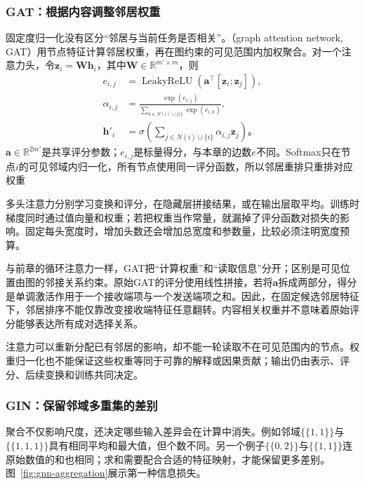 \subsubsection{GAT：根据内容调整邻居权重}
\label{sec:gnn-gat}

固定度归一化没有区分“邻居与当前任务是否相关”。（graph attention network, GAT）用节点特征计算邻居权重，再在图约束的可见范围内加权聚合。对一个注意力头，令$\bm{z}_i=\bm{W}\bm{h}_i$，其中$\bm{W}\in\mathbb{R}^{m'\times m}$，则
\begin{equation}
  \begin{aligned}
    e_{i,j}&=\operatorname{LeakyReLU}
      \!\left(\bm{a}^{\top}[\bm{z}_i;\bm{z}_j]\right),\\
    \alpha_{i,j}&=\frac{\exp(e_{i,j})}
      {\sum_{k\in N(i)\cup\{i\}}\exp(e_{i,k})},\\
    \bm{h}'_i&=\sigma\!\left(\sum_{j\in N(i)\cup\{i\}}
      \alpha_{i,j}\bm{z}_j\right)\text{。}
  \end{aligned}
  \label{eq:gnn-gat}
\end{equation}
$\bm{a}\in\mathbb{R}^{2m'}$是共享评分参数；$e_{i,j}$是标量得分，与本章的边数$e$不同。Softmax只在节点$i$的可见邻域内归一化，所有节点使用同一评分函数，所以邻居重排只重排对应权重

多头注意力分别学习变换和评分，在隐藏层拼接结果，或在输出层取平均。训练时梯度同时通过值向量和权重；若把权重当作常量，就漏掉了评分函数对损失的影响。固定每头宽度时，增加头数还会增加总宽度和参数量，比较必须注明宽度预算。

与前章的循环注意力一样，GAT把“计算权重”和“读取信息”分开；区别是可见位置由图的邻接关系约束。原始GAT的评分使用线性拼接，若将$\bm{a}$拆成两部分，得分是单调激活作用于一个接收端项与一个发送端项之和。因此，在固定候选邻居特征下，邻居排序不能仅靠改变接收端特征任意翻转。内容相关权重并不意味着原始评分能够表达所有成对选择关系。

注意力可以重新分配已有邻居的影响，却不能一轮读取不在可见范围内的节点。权重归一化也不能保证这些权重等同于可靠的解释或因果贡献；输出仍由表示、评分、后续变换和训练共同决定。

\subsubsection{GIN：保留邻域多重集的差别}
\label{sec:gnn-gin}

聚合不仅影响尺度，还决定哪些输入差异会在计算中消失。例如邻域$\{\!\{1,1\}\!\}$与$\{\!\{1,1,1\}\!\}$具有相同平均和最大值，但个数不同。另一个例子$\{\!\{0,2\}\!\}$与$\{\!\{1,1\}\!\}$连原始数值的和也相同；求和需要配合合适的特征映射，才能保留更多差别。图~\ref{fig:gnn-aggregation}展示第一种信息损失。

